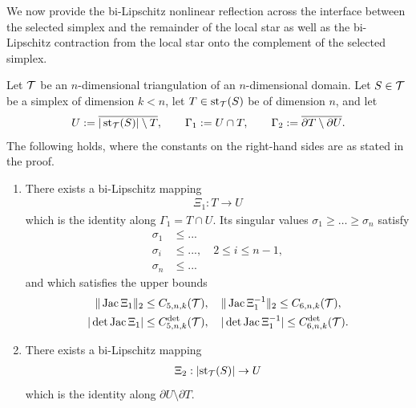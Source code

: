 \documentclass[10pt,a4paper]{article}
\begin{document}
We now provide the bi-Lipschitz nonlinear reflection across the interface between the selected simplex and the remainder of the local star
as well as the bi-Lipschitz contraction from the local star onto the complement of the selected simplex. 

\begin{proposition}\label{proposition:starreflection}
    Let ${\mathcal T}$ be an $n$-dimensional triangulation of an $n$-dimensional domain. 
    Let $S \in {\mathcal T}$ be a simplex of dimension $k < n$,
    let $T \in \operatorname{st}_{{\mathcal T}}(S)$ be of dimension $n$,
    and let 
    \begin{align*}
        U := \overline{ |\operatorname{st}_{{\mathcal T}}(S)| \setminus T },
        \qquad 
        {\Gamma_1} := U \cap T,
        \qquad 
        {\Gamma_2} := \overline{ \partial T \setminus \partial U }.
    \end{align*}
	The following holds, where the constants on the right-hand sides are as stated in the proof. 
    \begin{enumerate}
    \item 
    There exists a bi-Lipschitz mapping
    \begin{align*}
        \Xi_{1} : T \rightarrow U
    \end{align*}
    which is the identity along ${\Gamma_1} = T \cap U$. 
    Its singular values $\sigma_1 \geq \dots \geq \sigma_n$ satisfy 
    \begin{align*}
        \sigma_1 &\leq ...
        \\
        \sigma_i &\leq ..., \quad 2 \leq i \leq n-1,
        \\
        \sigma_n &\leq ...
    \end{align*}
    and which satisfies the upper bounds 
    \begin{gather*}
        \|  \operatorname{{\rm Jac}}\Xi_{1}  \|_{2}          \leq C_{5,n,k}({\mathcal T}),
        \quad 
        \|  \operatorname{{\rm Jac}}\Xi_{1}^{-1}  \|_{2}     \leq C_{6,n,k}({\mathcal T}),
        \\
        | \det\operatorname{{\rm Jac}}\Xi_{1} |      \leq C^{\det}_{5,n,k}({\mathcal T}),
        \quad 
        | \det\operatorname{{\rm Jac}}\Xi_{1}^{-1} | \leq C^{\det}_{6,n,k}({\mathcal T}).
    \end{gather*}
    \item 
    There exists a bi-Lipschitz mapping
    \begin{align*}
        \Xi_{2} : \left| \operatorname{st}_{{\mathcal T}}(S) \right| \rightarrow U
    \end{align*}
    which is the identity along $\partial U \setminus \partial T$.

\end{enumerate}
\end{proposition}
\end{document}
